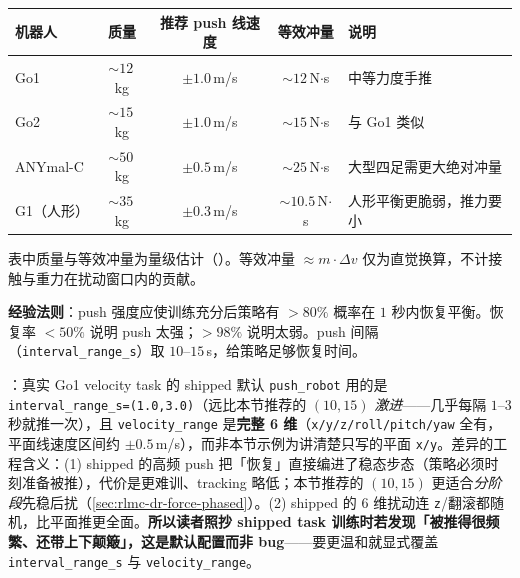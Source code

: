 \begin{center}
\small
\begin{tabular}{@{}lcccp{3.0cm}@{}}
\toprule
机器人 & 质量 & 推荐 push 线速度 & 等效冲量 & 说明 \\
\midrule
Go1 & $\sim 12$\,kg & $\pm 1.0$\,m/s & $\sim 12$\,N$\cdot$s & 中等力度手推 \\
Go2 & $\sim 15$\,kg & $\pm 1.0$\,m/s & $\sim 15$\,N$\cdot$s & 与 Go1 类似 \\
ANYmal-C & $\sim 50$\,kg & $\pm 0.5$\,m/s & $\sim 25$\,N$\cdot$s & 大型四足需更大绝对冲量 \\
G1（人形） & $\sim 35$\,kg & $\pm 0.3$\,m/s & $\sim 10.5$\,N$\cdot$s & 人形平衡更脆弱，推力要小 \\
\bottomrule
\end{tabular}
\end{center}

\begin{finenote}
表中质量与等效冲量为量级估计（）。等效冲量 $\approx m\cdot\Delta v$ 仅为直觉换算，不计接触与重力在扰动窗口内的贡献。
\end{finenote}

\textbf{经验法则}：push 强度应使训练充分后策略有 $>80\%$ 概率在 $1$ 秒内恢复平衡。恢复率 $<50\%$ 说明 push 太强；$>98\%$ 说明太弱。push 间隔（\verb|interval_range_s|）取 $10$--$15$\,s，给策略足够恢复时间。

\begin{finenote}
：真实 Go1 velocity task 的 shipped 默认 \verb|push_robot| 用的是 \verb|interval_range_s=(1.0,3.0)|（远比本节推荐的 $(10,15)$ \emph{激进}——几乎每隔 $1$--$3$ 秒就推一次），且 \verb|velocity_range| 是\textbf{完整 6 维}（\verb|x/y/z/roll/pitch/yaw| 全有，平面线速度区间约 $\pm 0.5$\,m/s），而非本节示例为讲清楚只写的平面 \verb|x/y|。差异的工程含义：(1) shipped 的高频 push 把「恢复」直接编进了稳态步态（策略必须时刻准备被推），代价是更难训、tracking 略低；本节推荐的 $(10,15)$ 更适合\emph{分阶段}先稳后扰（\cref{sec:rlmc-dr-force-phased}）。(2) shipped 的 6 维扰动连 \verb|z|/翻滚都随机，比平面推更全面。\textbf{所以读者照抄 shipped task 训练时若发现「被推得很频繁、还带上下颠簸」，这是默认配置而非 bug}——要更温和就显式覆盖 \verb|interval_range_s| 与 \verb|velocity_range|。
\end{finenote}

